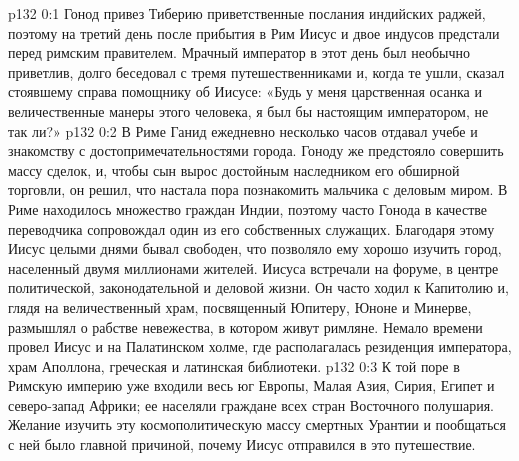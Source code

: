 \author{Комиссия срединников}
\vs p132 0:1 Гонод привез Тиберию приветственные послания индийских раджей, поэтому на третий день после прибытия в Рим Иисус и двое индусов предстали перед римским правителем. Мрачный император в этот день был необычно приветлив, долго беседовал с тремя путешественниками и, когда те ушли, сказал стоявшему справа помощнику об Иисусе: «Будь у меня царственная осанка и величественные манеры этого человека, я был бы настоящим императором, не так ли?»
\vs p132 0:2 \pc В Риме Ганид ежедневно несколько часов отдавал учебе и знакомству с достопримечательностями города. Гоноду же предстояло совершить массу сделок, и, чтобы сын вырос достойным наследником его обширной торговли, он решил, что настала пора познакомить мальчика с деловым миром. В Риме находилось множество граждан Индии, поэтому часто Гонода в качестве переводчика сопровождал один из его собственных служащих. Благодаря этому Иисус целыми днями бывал свободен, что позволяло ему хорошо изучить город, населенный двумя миллионами жителей. Иисуса встречали на форуме, в центре политической, законодательной и деловой жизни. Он часто ходил к Капитолию и, глядя на величественный храм, посвященный Юпитеру, Юноне и Минерве, размышлял о рабстве невежества, в котором живут римляне. Немало времени провел Иисус и на Палатинском холме, где располагалась резиденция императора, храм Аполлона, греческая и латинская библиотеки.
\vs p132 0:3 \pc К той поре в Римскую империю уже входили весь юг Европы, Малая Азия, Сирия, Египет и северо\hyp{}запад Африки; ее населяли граждане всех стран Восточного полушария. Желание изучить эту космополитическую массу смертных Урантии и пообщаться с ней было главной причиной, почему Иисус отправился в это путешествие.
